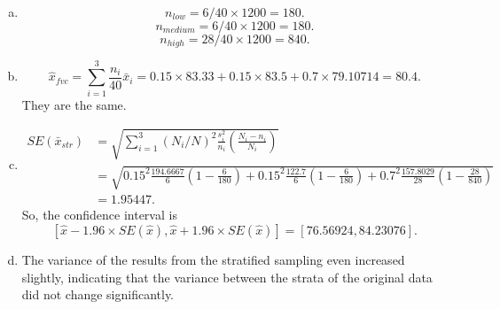 \documentclass[12pt]{article}
\begin{document}
    \begin{solution}
        \begin{enumerate}[a.]
            \item \[
                n_{low}=6/40\times1200=180. 
            \]
            \[
                n_{medium}=6/40\times1200=180. 
            \]
            \[
                n_{high}=28/40\times1200=840. 
            \]
            \item \[
                \hat{x}_{fvc}=\sum_{i=1}^3\frac{n_i}{40}\bar{x}_i=0.15\times83.33+0.15\times83.5+0.7\times79.10714=80.4. 
            \]
            They are the same. 
            \item \[
            \begin{aligned}
                SE(\bar{x}_{str})&=\sqrt{\sum_{i=1}^3(N_i/N)^2\frac{s_i^2}{n_i}\left(\frac{N_i-n_i}{N_i}\right)}\\
                &=\sqrt{0.15^2\frac{194.6667}{6}\left(1-\frac{6}{180}\right)+0.15^2\frac{122.7}{6}\left(1-\frac{6}{180}\right)+0.7^2\frac{157.8029}{28}\left(1-\frac{28}{840}\right)}\\
                &=1.95447. 
            \end{aligned}
            \]
            So, the confidence interval is 
            \[
                [\hat{x}-1.96\times SE(\hat{x}), \hat{x}+1.96\times SE(\hat{x})]=[76.56924, 84.23076]. 
            \]
            \item  The variance of the results from the stratified sampling even increased slightly, indicating that the variance between the strata of the original data did not change significantly. 
        \end{enumerate}
    \end{solution}
\end{document}
